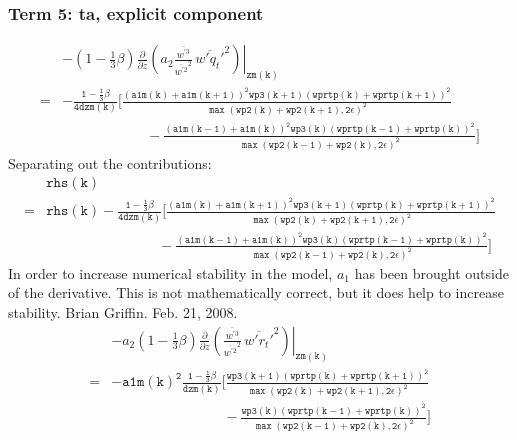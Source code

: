 \documentclass[11pt,fleqn]{article}
\newcommand{\ptlder}[2]{\frac{\partial #1}{\partial #2}}
\begin{document}
\subsubsection{Term 5:  ta, explicit component}

\begin{equation}
\begin{split}
& - \left. \left( 1 - \frac{1}{3}\beta \right)
       \ptlder{}{z}
         \left( 
           a_2
           \frac{\overline{w^{'3}}}{\overline{w^{'2}}^2} \,
           \overline{w'q_t'}^2
         \right) \right|_{\mathtt{zm(k)}} \\
=& \mathtt{
   - \frac{1 - \frac{1}{3}\beta}{4 dzm(k)}
     \bigg[ \frac{\left(a1m(k)+a1m(k+1)\right)^2 wp3(k+1) \left(wprtp(k)+wprtp(k+1)\right)^2}
                 {\max\left(wp2(k)+wp2(k+1),2\epsilon\right)^2} } \\
 & \mathtt{ \quad \quad \quad \quad \quad \quad
           -\frac{\left(a1m(k-1)+a1m(k)\right)^2 wp3(k) \left(wprtp(k-1)+wprtp(k)\right)^2}
                 {\max\left(wp2(k-1)+wp2(k),2\epsilon\right)^2}
     \bigg]
   }
\end{split}
\end{equation}
%
Separating out the contributions:
%
\begin{equation}
\begin{split}
&\mathtt{rhs(k)} \\
=& \mathtt{
   rhs(k)
   - \frac{1 - \frac{1}{3}\beta}{4 dzm(k)}
     \bigg[ \frac{\left(a1m(k)+a1m(k+1)\right)^2 wp3(k+1) \left(wprtp(k)+wprtp(k+1)\right)^2}
                 {\max\left(wp2(k)+wp2(k+1),2\epsilon\right)^2} } \\
 & \mathtt{ \quad \quad \quad \quad \quad \quad \quad \quad
           -\frac{\left(a1m(k-1)+a1m(k)\right)^2 wp3(k) \left(wprtp(k-1)+wprtp(k)\right)^2}
                 {\max\left(wp2(k-1)+wp2(k),2\epsilon\right)^2}
     \bigg]
   }
\end{split}
\end{equation}
%
In order to increase numerical stability in the model, $a_{1}$ has been brought
outside of the derivative.  This is not mathematically correct, but it does 
help to increase stability.  Brian Griffin.  Feb. 21, 2008.
% 
\begin{equation}
\begin{split}
& - \left. a_2 \left( 1 - \frac{1}{3}\beta \right)
       \ptlder{}{z}
         \left( 
           \frac{\overline{w^{'3}}}{\overline{w^{'2}}^2} \,
           \overline{w'r_t'}^2
         \right) \right|_{\mathtt{zm(k)}} \\
=& \mathtt{
   - a1m(k)^{2}\frac{1 - \frac{1}{3}\beta}{dzm(k)}
     \bigg[ \frac{wp3(k+1) \left(wprtp(k)+wprtp(k+1)\right)^2}
                 {\max\left(wp2(k)+wp2(k+1),2\epsilon\right)^2} } \\
 & \mathtt{ \quad \quad \quad \quad \quad \quad \quad \quad
           -\frac{wp3(k) \left(wprtp(k-1)+wprtp(k)\right)^2}
                 {\max\left(wp2(k-1)+wp2(k),2\epsilon\right)^2}
     \bigg]
   }
\end{split}
\end{equation}
\end{document}
